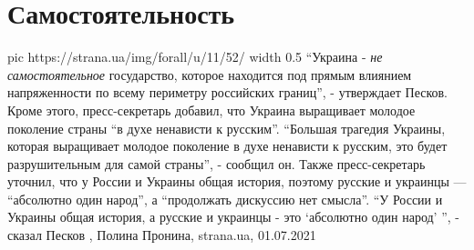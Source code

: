  
 
 
 
 
\chapter{Самостоятельность}
\label{sec:slova.samostojatelnost}

\ifcmt
  pic https://strana.ua/img/forall/u/11/52/%
	width 0.5
\fi
\enquote{Украина - \emph{не самостоятельное} государство, которое находится под
прямым влиянием напряженности по всему периметру российских границ}, -
утверждает Песков.  Кроме этого, пресс-секретарь добавил, что Украина
выращивает молодое поколение страны \enquote{в духе ненависти к русским}.
\enquote{Большая трагедия Украины, которая выращивает молодое поколение в духе
ненависти к русским, это будет разрушительным для самой страны}, - сообщил он.
Также пресс-секретарь уточнил, что у России и Украины общая история, поэтому
русские и украинцы — \enquote{абсолютно один народ}, а \enquote{продолжать
дискуссию нет смысла}.  \enquote{У России и Украины общая история, а русские и
украинцы - это \enquote{абсолютно один народ} }, - сказал Песков
, 
Полина Пронина, strana.ua, 01.07.2021

